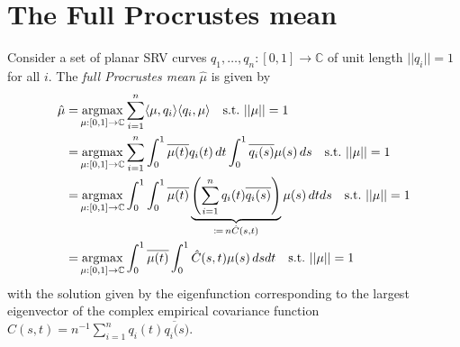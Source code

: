 \section{The Full Procrustes mean}
Consider a set of planar SRV curves $q_1,\dots,q_n : [0,1] \rightarrow \mathbb{C}$ of unit length $||q_i|| = 1$ for all $i$.
The \textit{full Procrustes mean} $\hat{\mu}$ is given by
\begin{align*}
    \hat{\mu} =& \operatorname*{argmax}_{\mu:[0,1]\rightarrow\mathbb{C}} \sum_{i=1}^n \langle \mu, q_i \rangle \langle q_i, \mu \rangle
    \quad\text{s.t.}\,\, ||\mu|| = 1 \\
    =& \operatorname*{argmax}_{\mu:[0,1]\rightarrow\mathbb{C}} \sum_{i=1}^n
    \int_0^1 \overline{\mu(t)} q_i(t) \, dt \int_0^1 \overline{q_i(s)} \mu(s) \, ds
    \quad\text{s.t.}\,\, ||\mu|| = 1 \\
    =& \operatorname*{argmax}_{\mu:[0,1]\rightarrow\mathbb{C}}  \int_0^1 \int_0^1
    \overline{\mu(t)} \underbrace{\left( \sum_{i=1}^n q_i(t) \overline{q_i(s)} \right)}_{\coloneqq \, n \hat{C}(s,t)} \mu(s) \, dt ds
    \quad\text{s.t.}\,\, ||\mu|| = 1 \\
    =& \operatorname*{argmax}_{\mu:[0,1]\rightarrow\mathbb{C}} \int_0^1
    \overline{\mu(t)} \int_0^1 \hat{C}(s,t) \mu(s) \, ds dt
    \quad\text{s.t.}\,\, ||\mu|| = 1
\end{align*}
with the solution given by the eigenfunction corresponding to the largest eigenvector of the complex empirical covariance function $\hat{C}(s,t) = n^{-1} \sum_{i=1}^n q_i(t) \overline{q_i(s})$.




